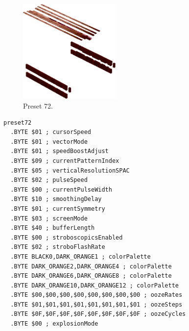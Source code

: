\clearpage
\begin{minipage}[b]{0.48\linewidth}
\begin{figure}[H]                                                          
  \centering                                                             
  \begin{adjustbox}{width=5cm,center}                                   
  \includegraphics[width=5cm]{src/colorspace_presets/preset72-45.png}%
  \end{adjustbox}                                                        
\caption*{Preset 72.}                                           
\end{figure}                                                               
\end{minipage}
\hspace{0.1cm}
\begin{minipage}[b]{0.48\linewidth}                            
\begin{lstlisting}[basicstyle=\ttfamily\tiny]
preset72
  .BYTE $01 ; cursorSpeed
  .BYTE $01 ; vectorMode
  .BYTE $01 ; speedBoostAdjust
  .BYTE $09 ; currentPatternIndex
  .BYTE $05 ; verticalResolutionSPAC
  .BYTE $02 ; pulseSpeed
  .BYTE $00 ; currentPulseWidth
  .BYTE $10 ; smoothingDelay
  .BYTE $01 ; currentSymmetry
  .BYTE $03 ; screenMode
  .BYTE $40 ; bufferLength
  .BYTE $00 ; stroboscopicsEnabled
  .BYTE $02 ; stroboFlashRate
  .BYTE BLACK0,DARK_ORANGE1 ; colorPalette
  .BYTE DARK_ORANGE2,DARK_ORANGE4 ; colorPalette
  .BYTE DARK_ORANGE6,DARK_ORANGE8 ; colorPalette
  .BYTE DARK_ORANGE10,DARK_ORANGE12 ; colorPalette
  .BYTE $00,$00,$00,$00,$00,$00,$00,$00 ; oozeRates
  .BYTE $01,$01,$01,$01,$01,$01,$01,$01 ; oozeSteps
  .BYTE $0F,$0F,$0F,$0F,$0F,$0F,$0F,$0F ; oozeCycles
  .BYTE $00 ; explosionMode
\end{lstlisting}
\end{minipage}

\vspace*{0.3cm}

